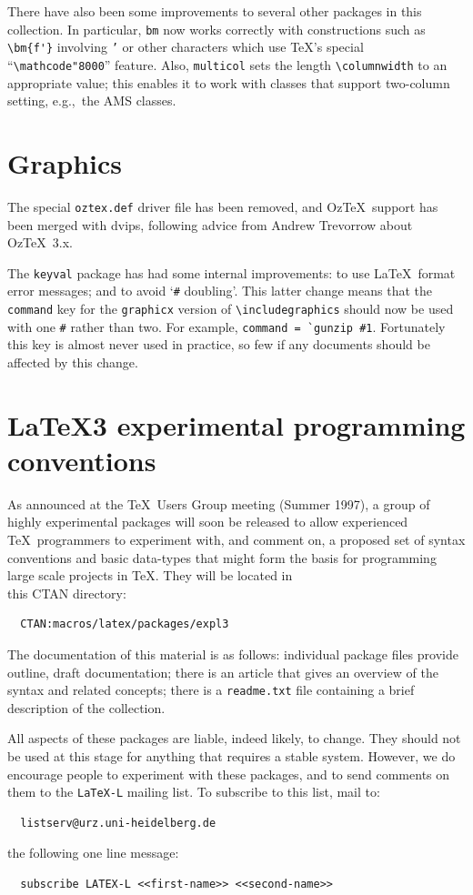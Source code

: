 \documentclass{ltnews}
\providecommand\pkg[1]{\texttt{#1}}
\providecommand\file[1]{\texttt{#1}}
\begin{document}
There have also been some improvements to several other packages in
this collection.  In particular, \pkg{bm} now works correctly with
constructions such as \verb|\bm{f'}| involving \texttt{'} or other
characters which use \TeX's special ``\verb|\mathcode"8000|''
feature.  Also, \pkg{multicol} sets the length \verb|\columnwidth|
to an appropriate value; this enables it to work with classes that
support two-column setting, e.g.,~the AMS classes.


\section{Graphics}

The special \verb|oztex.def| driver file has been removed, and Oz\TeX\
support has been merged with dvips, following advice from
Andrew Trevorrow about Oz\TeX~3.x.

The \pkg{keyval} package has had some internal improvements: to
use \LaTeX\ format error messages; and to avoid `\verb|#| doubling'.
This latter change means that the \verb|command| key for the
\pkg{graphicx} version of \verb|\includegraphics| should now be used
with one \verb|#| rather than two. For example, \verb|command = `gunzip #1|.
Fortunately this key is almost never used in practice, so few if any
documents should be affected by this change.


\section{\LaTeX3 experimental programming conventions}

As announced at the \TeX\ Users Group meeting  (Summer 1997), a group of
highly experimental packages will soon be released to allow experienced\\
\TeX\ programmers to experiment with, and comment on, a proposed set
of syntax conventions and basic data-types that might form
the basis for programming large scale projects in \TeX.
They will be located in\\
this CTAN directory:
\begin{verbatim}
  CTAN:macros/latex/packages/expl3
\end{verbatim}
The documentation of this material is as follows: individual package
files provide outline, draft documentation; there is an article that
gives an overview of the syntax and related concepts; there is a
\file{readme.txt} file containing a brief description of the
collection.

All aspects of these packages are liable, indeed likely, to change.
They should not be used at this stage for anything
that requires a stable system.  However, we do encourage people to
experiment with these packages, and to send comments on them to the
\texttt{LaTeX-L} mailing list.
To subscribe to this list, mail to:
\begin{verbatim}
  listserv@urz.uni-heidelberg.de
\end{verbatim}
the following one line message:
\begin{verbatim}
  subscribe LATEX-L <<first-name>> <<second-name>>
\end{verbatim}
\end{document}
